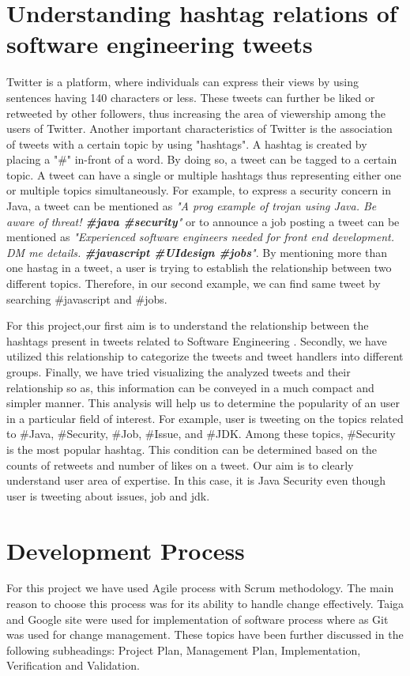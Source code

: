 \documentclass[11pt]{article}
\begin{document}
\section{Understanding hashtag relations of software engineering tweets}
Twitter is a platform, where individuals can express their views by using sentences having 140 characters or less. These tweets can further be liked or retweeted by other followers, thus increasing the area of viewership among the users of Twitter. Another important characteristics of Twitter is the association of tweets with a certain topic by using "hashtags". A hashtag is created by placing a "\#" in-front of a word. By doing so, a tweet can be tagged to a certain topic. A tweet can have a single or multiple hashtags thus representing either one or multiple topics simultaneously. For example, to express a security concern in Java, a tweet can be mentioned as \textit{"A prog example of trojan using Java. Be aware of threat! \textbf{\textit{\#java \#security}}"} or to announce a job posting a tweet can be mentioned as \textit{"Experienced software engineers needed for front end development. DM me details. \textbf{\textit{\#javascript \#UIdesign \#jobs}}"}. By mentioning more than one hastag in a tweet, a user is trying to establish the relationship between two different topics. Therefore, in our second example, we can find same tweet by searching \#javascript and \#jobs. 

For this project,our first aim is to understand the relationship between the hashtags present in tweets related to Software Engineering . Secondly, we have utilized this relationship to categorize the tweets and tweet handlers into different groups. Finally, we have tried visualizing the analyzed tweets and their relationship so as, this information can be conveyed in a much compact and simpler manner. This analysis will help us to determine the popularity of an user in a particular field of interest. For example, user is tweeting on the topics related to \#Java, \#Security, \#Job, \#Issue, and \#JDK. Among these topics, \#Security is the most popular hashtag. This condition can be determined based on the counts of retweets and number of likes on a tweet. Our aim is to clearly understand user area of expertise. In this case, it is Java Security even though user is tweeting about issues, job and jdk.

\section{Development Process}
For this project we have used Agile process with Scrum methodology. The main reason to choose this process was for its ability to handle change effectively. Taiga and Google site were used for implementation of software process where as Git was used for change management. These topics have been further discussed in the following subheadings: Project Plan, Management Plan, Implementation, Verification and Validation.
\end{document}

